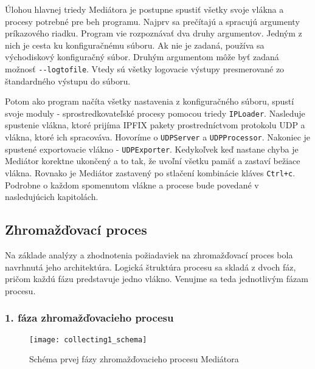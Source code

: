 Úlohou hlavnej triedy Mediátora je postupne spustiť všetky svoje vlákna a procesy potrebné pre beh 
programu. Najprv sa prečítajú a spracujú argumenty príkazového riadku. Program vie rozpoznávať dva druhy 
argumentov. Jedným z nich je cesta ku konfiguračnému súboru. Ak nie je zadaná, používa sa východiskový 
konfiguračný súbor. Druhým argumentom môže byť zadaná možnosť \verb|--logtofile|. Vtedy sú všetky 
logovacie výstupy presmerované zo štandardného výstupu do súboru.

Potom ako program načíta všetky nastavenia z konfiguračného súboru, spustí svoje moduly - 
sprostredkovateľské procesy pomocou triedy \verb|IPLoader|. Nasleduje spustenie vlákna, ktoré prijíma 
IPFIX pakety prostredníctvom protokolu UDP a vlákna, ktoré ich spracováva. Hovoríme o \verb|UDPServer| 
a \verb|UDPProcessor|. Nakoniec je spustené exportovacie vlákno - \verb|UDPExporter|. Kedykoľvek keď 
nastane chyba je Mediátor korektne ukončený a to tak, že uvoľní všetku pamäť a zastaví bežiace vlákna. 
Rovnako je Mediátor zastavený po stlačení kombinácie kláves \verb|Ctrl+c|.
Podrobne o každom spomenutom vlákne a procese bude povedané v nasledujúcich kapitolách.







\subsection{Zhromažďovací proces} \label{sec:collectingprocess}

Na základe analýzy a zhodnotenia požiadaviek na zhromažďovací proces bola navrhnutá jeho architektúra.
Logická štruktúra procesu sa skladá z dvoch fáz, pričom každú fázu predstavuje jedno vlákno. 
Venujme sa teda jednotlivým fázam procesu.

\subsubsection{1. fáza zhromažďovacieho procesu}

\begin{figure}[ht!]
\centering
\texttt{[image: collecting1\_schema]}
\caption{Schéma prvej fázy zhromažďovacieho procesu Mediátora}\label{o:collecting1_schema}
\end{figure}


